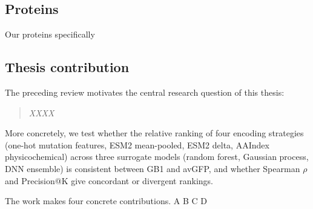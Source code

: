 \subsection{Proteins}
Our proteins specifically
\subsection{Thesis contribution}
\label{sec:litrev:rq}

The preceding review motivates the central research question of this thesis:

\begin{quote}
  \emph{XXXX}
\end{quote}

More concretely, we test whether the relative ranking of four encoding strategies
(one-hot mutation features, ESM2 mean-pooled, ESM2 delta, AAIndex physicochemical)
across three surrogate models (random forest, Gaussian process, DNN ensemble) is consistent
between GB1 and avGFP, and whether Spearman $\rho$ and Precision@K give concordant or
divergent rankings.

The work makes four concrete contributions.
A
B
C
D
